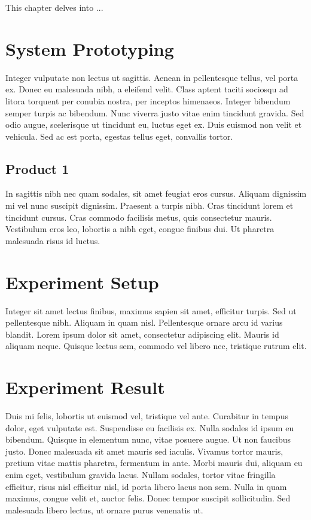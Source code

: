 This chapter delves into ...

\section{System Prototyping}
Integer vulputate non lectus ut sagittis. Aenean in pellentesque tellus, vel porta ex. Donec eu malesuada nibh, a eleifend velit. Class aptent taciti sociosqu ad litora torquent per conubia nostra, per inceptos himenaeos. Integer bibendum semper turpis ac bibendum. Nunc viverra justo vitae enim tincidunt gravida. Sed odio augue, scelerisque ut tincidunt eu, luctus eget ex. Duis euismod non velit et vehicula. Sed ac est porta, egestas tellus eget, convallis tortor.

\subsection{Product 1}
In sagittis nibh nec quam sodales, sit amet feugiat eros cursus. Aliquam dignissim mi vel nunc suscipit dignissim. Praesent a turpis nibh. Cras tincidunt lorem et tincidunt cursus. Cras commodo facilisis metus, quis consectetur mauris. Vestibulum eros leo, lobortis a nibh eget, congue finibus dui. Ut pharetra malesuada risus id luctus.

\section{Experiment Setup}
Integer sit amet lectus finibus, maximus sapien sit amet, efficitur turpis. Sed ut pellentesque nibh. Aliquam in quam nisl. Pellentesque ornare arcu id varius blandit. Lorem ipsum dolor sit amet, consectetur adipiscing elit. Mauris id aliquam neque. Quisque lectus sem, commodo vel libero nec, tristique rutrum elit.

\section{Experiment Result}
Duis mi felis, lobortis ut euismod vel, tristique vel ante. Curabitur in tempus dolor, eget vulputate est. Suspendisse eu facilisis ex. Nulla sodales id ipsum eu bibendum. Quisque in elementum nunc, vitae posuere augue. Ut non faucibus justo. Donec malesuada sit amet mauris sed iaculis. Vivamus tortor mauris, pretium vitae mattis pharetra, fermentum in ante. Morbi mauris dui, aliquam eu enim eget, vestibulum gravida lacus. Nullam sodales, tortor vitae fringilla efficitur, risus nisl efficitur nisl, id porta libero lacus non sem. Nulla in quam maximus, congue velit et, auctor felis. Donec tempor suscipit sollicitudin. Sed malesuada libero lectus, ut ornare purus venenatis ut.